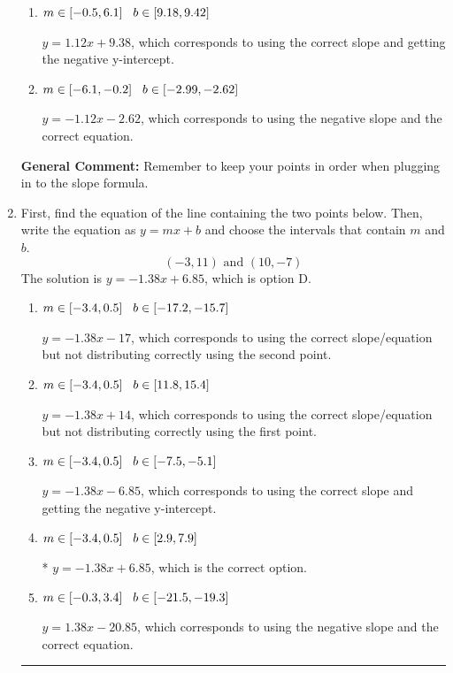 \documentclass{extbook}[14pt]
\newcommand{\litem}[1]{\item #1

\rule{\textwidth}{0.4pt}}
\begin{document}
\begin{enumerate}
{\begin{enumerate}[label=\Alph*.]
 $y = 1.12x -9$, which corresponds to using the correct slope/equation but not distributing correctly using the second point.
\item \( m \in [-0.5, 6.1] \hspace*{3mm} b \in [9.18, 9.42] \)

 $y = 1.12x + 9.38$, which corresponds to using the correct slope and getting the negative y-intercept.
\item \( m \in [-6.1, -0.2] \hspace*{3mm} b \in [-2.99, -2.62] \)

 $y = -1.12x -2.62$, which corresponds to using the negative slope and the correct equation.
\end{enumerate}

\textbf{General Comment:} Remember to keep your points in order when plugging in to the slope formula.
}
\litem{
First, find the equation of the line containing the two points below. Then, write the equation as $ y=mx+b $ and choose the intervals that contain $m$ and $b$.
\[ (-3, 11) \text{ and } (10, -7) \]
The solution is \( y = -1.38x + 6.85 \), which is option D.\begin{enumerate}[label=\Alph*.]
\item \( m \in [-3.4, 0.5] \hspace*{3mm} b \in [-17.2, -15.7] \)

 $y = -1.38x -17$, which corresponds to using the correct slope/equation but not distributing correctly using the second point.
\item \( m \in [-3.4, 0.5] \hspace*{3mm} b \in [11.8, 15.4] \)

 $y = -1.38x + 14$, which corresponds to using the correct slope/equation but not distributing correctly using the first point.
\item \( m \in [-3.4, 0.5] \hspace*{3mm} b \in [-7.5, -5.1] \)

 $y = -1.38x -6.85$, which corresponds to using the correct slope and getting the negative y-intercept.
\item \( m \in [-3.4, 0.5] \hspace*{3mm} b \in [2.9, 7.9] \)

* $y = -1.38x + 6.85$, which is the correct option.
\item \( m \in [-0.3, 3.4] \hspace*{3mm} b \in [-21.5, -19.3] \)

 $y = 1.38x -20.85$, which corresponds to using the negative slope and the correct equation.
\end{enumerate}

}
\end{enumerate}
\end{document}

